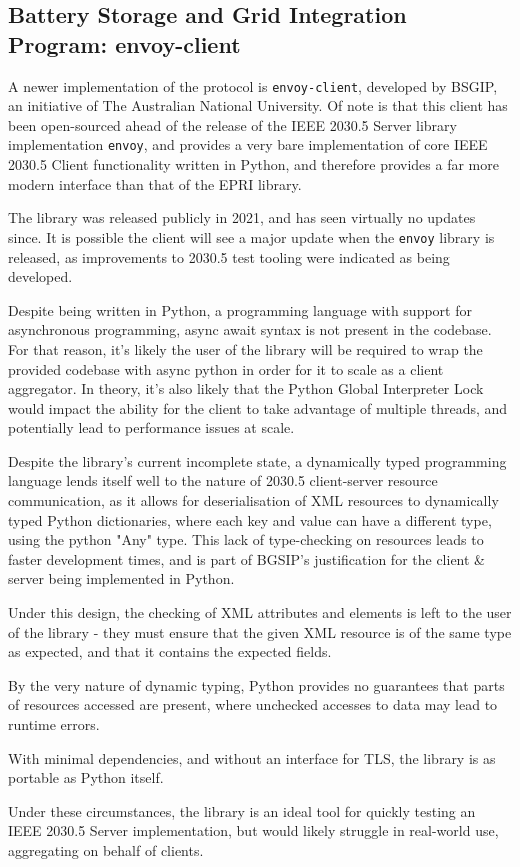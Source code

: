 \subsection{Battery Storage and Grid Integration Program: envoy-client}
A newer implementation of the protocol is \texttt{envoy-client}, developed by BSGIP, an initiative of The Australian National University. Of note is that this client has been open-sourced ahead of the release of the IEEE 2030.5 Server library implementation \texttt{envoy}, and provides a very bare implementation of core IEEE 2030.5 Client functionality written in Python, and therefore provides a far more modern interface than that of the EPRI library. \cite{envoyclient}

The library was released publicly in 2021, and has seen virtually no updates since. It is possible the client will see a major update when the \texttt{envoy} library is released, as improvements to 2030.5 test tooling were indicated as being developed. \cite{DOEAdoption}


Despite being written in Python, a programming language with support for asynchronous programming, async await syntax is not present in the codebase. For that reason, it's likely the user of the library will be required to wrap the provided codebase with async python in order for it to scale as a client aggregator. In theory, it's also likely that the Python Global Interpreter Lock would impact the ability for the client to take advantage of multiple threads, and potentially lead to performance issues at scale. 

Despite the library's current incomplete state, a dynamically typed programming language lends itself well to the nature of 2030.5 client-server resource communication, as it allows for deserialisation of XML resources to dynamically typed Python dictionaries, where each key and value can have a different type, using the python "Any" type. This lack of type-checking on resources leads to faster development times, and is part of BGSIP's justification for the client \& server being implemented in Python. 

Under this design, the checking of XML attributes and elements is left to the user of the library - they must ensure that the given XML resource is of the same type as expected, and that it contains the expected fields. 

By the very nature of dynamic typing, Python provides no guarantees that parts of resources accessed are present, where unchecked accesses to data may lead to runtime errors. 

With minimal dependencies, and without an interface for TLS, the library is as portable as Python itself.

Under these circumstances, the library is an ideal tool for quickly testing an IEEE 2030.5 Server implementation, but would likely struggle in real-world use, aggregating on behalf of clients.








